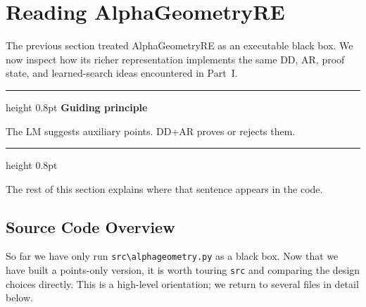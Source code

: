 \documentclass[reqno]{amsart}
\newenvironment{lecturebox}[1]{%
    \par\medskip
    \noindent\begingroup
    \setlength{\parindent}{0pt}
    \color{agblue}\hrule height 0.8pt\color{black}
    \smallskip
    \textbf{\color{agblue}#1}\par\smallskip
}{%
    \smallskip
    \color{agblue}\hrule height 0.8pt\color{black}
    \endgroup
    \medskip
}
\DeclareMathOperator{\1}{\textbf{1}}
\begin{document}
\section{Reading AlphaGeometryRE}\label{sec: Reading AlphaGeometryRE}

The previous section treated AlphaGeometryRE as an executable black box. We
now inspect how its richer representation implements the same DD, AR, proof
state, and learned-search ideas encountered in Part~I.

\begin{lecturebox}{Guiding principle}
The LM suggests auxiliary points. DD+AR proves or rejects them.
\end{lecturebox}

The rest of this section explains where that sentence appears in the code.

\subsection{Source Code Overview}\label{sec: Source Code Overview}

So far we have only run \verb|src\alphageometry.py| as a black box. Now that
we have built a points-only version, it is worth touring \verb|src| and
comparing the design choices directly. This is a high-level orientation; we
return to several files in detail below.
\end{document}
